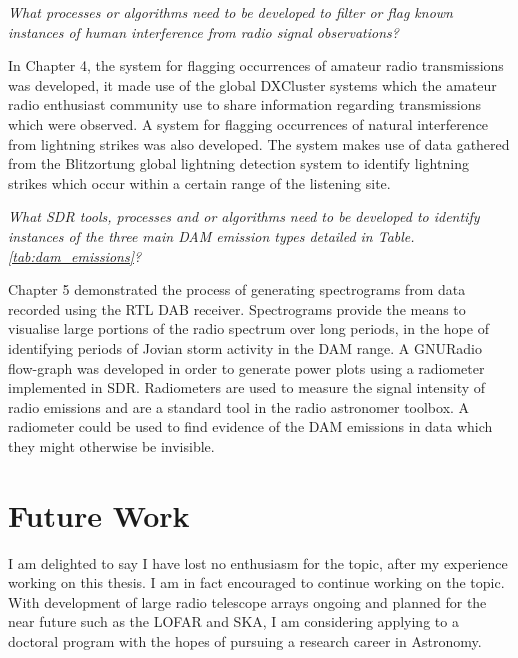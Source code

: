 \textit{What processes or algorithms need to be developed to filter or flag known instances of human interference from radio signal observations?}

In Chapter 4, the system for flagging occurrences of amateur radio transmissions was developed, it made use of the global DXCluster systems which the amateur radio enthusiast community use to share information regarding transmissions which were observed. A system for flagging occurrences of natural interference from lightning strikes was also developed. The system makes use of data gathered from the Blitzortung global lightning detection system to identify lightning strikes which occur within a certain range of the listening site.

\textit{What \gls{SDR} tools, processes and or algorithms need to be developed to identify instances of the three main \gls{DAM} emission types detailed in Table. \ref{tab:dam_emissions}?}

Chapter 5 demonstrated the process of generating spectrograms from data recorded using the RTL DAB receiver. Spectrograms provide the means to visualise large portions of the radio spectrum over long periods, in the hope of identifying periods of Jovian storm activity in the \gls{DAM} range. A GNURadio flow-graph was developed in order to generate power plots using a radiometer implemented in \gls{SDR}. Radiometers are used to measure the signal intensity of radio emissions and are a standard tool in the radio astronomer toolbox. A radiometer could be used to find evidence of the \gls{DAM} emissions in data which they might otherwise be invisible.

%
%
\section*{Future Work}

I am delighted to say I have lost no enthusiasm for the topic, after my experience working on this thesis. I am in fact encouraged to continue working on the topic. With development of large radio telescope arrays ongoing and planned for the near future such as the LOFAR and SKA, I am considering applying to a doctoral program with the hopes of pursuing a research career in Astronomy.

